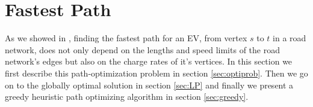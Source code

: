 \section{Fastest Path}

As we showed in , finding the fastest path for an EV, from vertex $s$ to $t$ in a road network, does not only depend on the lengths and speed limits of the road network's edges but also on the charge rates of it's vertices. In this section we first describe this path-optimization problem in section \ref{sec:optiprob}. Then we go on to the globally optimal solution in section \ref{sec:LP} and finally we present a greedy heuristic path optimizing algorithm in section \ref{sec:greedy}.